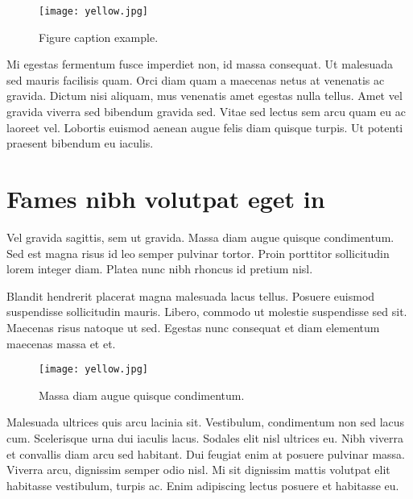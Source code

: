 \documentclass[
]{HyperedReport}
\begin{document}
\begin{figure}[H] %
	\texttt{[image: yellow.jpg]}
	\caption{Figure caption example.}
\end{figure}

Mi egestas fermentum fusce imperdiet non, id massa consequat. Ut malesuada sed mauris facilisis quam. Orci diam quam a maecenas netus at venenatis ac gravida. Dictum nisi aliquam, mus venenatis amet egestas nulla tellus. Amet vel gravida viverra sed bibendum gravida sed. Vitae sed lectus sem arcu quam eu ac laoreet vel. Lobortis euismod aenean augue felis diam quisque turpis. Ut potenti praesent bibendum eu iaculis.


\newpage

\section*{Fames nibh volutpat eget in}

Vel gravida sagittis, sem ut gravida. Massa diam augue quisque condimentum. Sed est magna risus id leo semper pulvinar tortor. Proin porttitor sollicitudin lorem integer diam. Platea nunc nibh rhoncus id pretium nisl.

Blandit hendrerit placerat magna malesuada lacus tellus. Posuere euismod suspendisse sollicitudin mauris. Libero, commodo ut molestie suspendisse sed sit. Maecenas risus natoque ut sed. Egestas nunc consequat et diam elementum maecenas massa et et.

\begin{figure*}[H] %
	\texttt{[image: yellow.jpg]}
	\caption{Massa diam augue quisque condimentum.}
\end{figure*}

Malesuada ultrices quis arcu lacinia sit. Vestibulum, condimentum non sed lacus cum. Scelerisque urna dui iaculis lacus. Sodales elit nisl ultrices eu. Nibh viverra et convallis diam arcu sed habitant. Dui feugiat enim at posuere pulvinar massa. Viverra arcu, dignissim semper odio nisl. Mi sit dignissim mattis volutpat elit habitasse vestibulum, turpis ac. Enim adipiscing lectus posuere et habitasse eu.


\newpage
\end{document}
